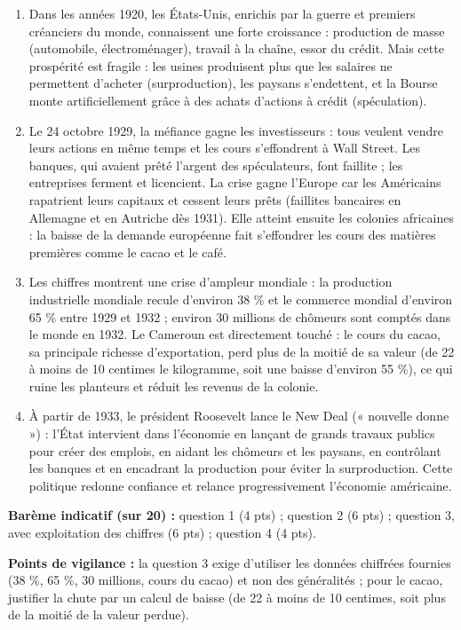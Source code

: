 \documentclass[11pt]{article}
\begin{document}
\begin{corrige}
\begin{enumerate}
\item Dans les années 1920, les États-Unis, enrichis par la guerre et premiers créanciers du monde, connaissent une forte croissance : production de masse (automobile, électroménager), travail à la chaîne, essor du crédit. Mais cette prospérité est fragile : les usines produisent plus que les salaires ne permettent d'acheter (surproduction), les paysans s'endettent, et la Bourse monte artificiellement grâce à des achats d'actions à crédit (spéculation).
\item Le 24 octobre 1929, la méfiance gagne les investisseurs : tous veulent vendre leurs actions en même temps et les cours s'effondrent à Wall Street. Les banques, qui avaient prêté l'argent des spéculateurs, font faillite ; les entreprises ferment et licencient. La crise gagne l'Europe car les Américains rapatrient leurs capitaux et cessent leurs prêts (faillites bancaires en Allemagne et en Autriche dès 1931). Elle atteint ensuite les colonies africaines : la baisse de la demande européenne fait s'effondrer les cours des matières premières comme le cacao et le café.
\item Les chiffres montrent une crise d'ampleur mondiale : la production industrielle mondiale recule d'environ 38 \% et le commerce mondial d'environ 65 \% entre 1929 et 1932 ; environ 30 millions de chômeurs sont comptés dans le monde en 1932. Le Cameroun est directement touché : le cours du cacao, sa principale richesse d'exportation, perd plus de la moitié de sa valeur (de 22 à moins de 10 centimes le kilogramme, soit une baisse d'environ 55 \%), ce qui ruine les planteurs et réduit les revenus de la colonie.
\item À partir de 1933, le président Roosevelt lance le New Deal (« nouvelle donne ») : l'État intervient dans l'économie en lançant de grands travaux publics pour créer des emplois, en aidant les chômeurs et les paysans, en contrôlant les banques et en encadrant la production pour éviter la surproduction. Cette politique redonne confiance et relance progressivement l'économie américaine.
\end{enumerate}
\textbf{Barème indicatif (sur 20) :} question 1 (4 pts) ; question 2 (6 pts) ; question 3, avec exploitation des chiffres (6 pts) ; question 4 (4 pts).

\textbf{Points de vigilance :} la question 3 exige d'utiliser les données chiffrées fournies (38 \%, 65 \%, 30 millions, cours du cacao) et non des généralités ; pour le cacao, justifier la chute par un calcul de baisse (de 22 à moins de 10 centimes, soit plus de la moitié de la valeur perdue).
\end{corrige}
\end{document}
